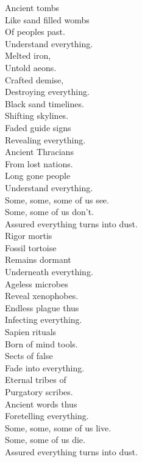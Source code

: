 Ancient tombs \\
Like sand filled wombs \\
Of peoples  past. \\
Understand everything. \\
Melted iron, \\
Untold aeons. \\
Crafted demise, \\
Destroying everything. \\

Black sand timelines. \\
Shifting skylines. \\
Faded guide signs \\
Revealing everything. \\
Ancient Thracians \\
From lost nations. \\
Long gone people \\
Understand everything. \\

Some, some, some of us see. \\
Some, some of us don't. \\
Assured everything turns into dust. \\

Rigor mortis \\
Fossil tortoise \\
Remains dormant \\
Underneath everything. \\
Ageless microbes \\
Reveal xenophobes. \\
Endless plague thus \\
Infecting everything. \\

Sapien rituals \\
Born of mind tools. \\
Sects of false  \\
Fade into everything. \\
Eternal tribes of \\
Purgatory scribes. \\
Ancient words thus \\
Foretelling everything. \\

Some, some, some of us live. \\
Some, some of us die. \\
Assured everything turns into dust. \\

